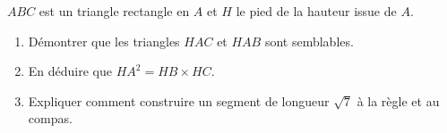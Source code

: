 
$ABC$ est un triangle rectangle en $A$ et $H$ le pied de la hauteur issue de $A$.

\begin{enumerate}
\item Démontrer que les triangles $HAC$ et $HAB$ sont semblables.
\item En déduire que $HA^2=HB \times HC$.
\item Expliquer comment construire un segment de longueur $\sqrt{7}$ à la règle et au compas.
\end{enumerate}